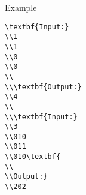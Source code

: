 Example
\begin{verbatim}
\textbf{Input:}
\\1
\\1
\\0
\\0
\\
\\\textbf{Output:}
\\4
\\
\\\textbf{Input:}
\\3
\\010
\\011
\\010\textbf{
\\
\\Output:}
\\202\end{verbatim}